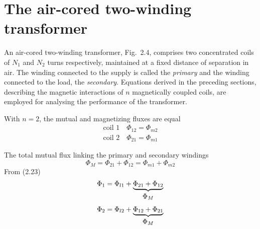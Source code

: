 \documentclass[a4paper,numbers=noenddot,12pt]{scrbook}
\begin{document}
\section{The air-cored two-winding transformer}
An air-cored two-winding transformer, Fig.\ 2.4, comprises two concentrated coils of $N_1$ and $N_2$ turns respectively, maintained at a fixed distance of separation in air. The winding connected to the supply is called the \textit{primary} and the winding connected to the load, the \textit{secondary}. Equations derived in the preceding sections, describing the magnetic interactions of $n$ magnetically coupled coils, are employed for analysing the performance of the transformer.

With $n = 2$, the mutual and magnetizing fluxes are equal
\begin{equation}
    \begin{aligned}
        \text{coil 1}\quad \Phi_{12} = \Phi_{m2} \\
        \text{coil 2}\quad \Phi_{21} = \Phi_{m1} 
    \end{aligned}
    \label{eq:Eq2.28}
\end{equation}

The total mutual flux linking the primary and secondary windings
\begin{equation}
    \Phi_M = \Phi_{21} + \Phi_{12} = \Phi_{m1} + \Phi_{m2}
    \label{eq:Eq2.29}
\end{equation}
From (2.23)
\begin{equation}
    \Phi_1 = \Phi_{l1} + \underbrace{\Phi_{21} + \Phi_{12}}_{%
        \begin{gathered}
            \Phi_M
        \end{gathered}}
    \label{eq:Eq2.30}
\end{equation}
\begin{equation}
    \Phi_2 = \Phi_{l2} + \underbrace{\Phi_{12} + \Phi_{21}}_{%
        \begin{gathered}
            \Phi_M
        \end{gathered}}
    \label{eq:Eq2.31}
\end{equation}
\end{document}
